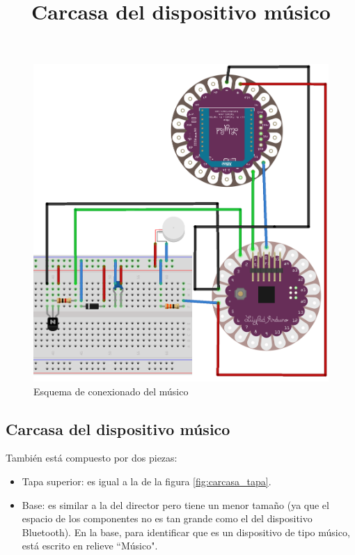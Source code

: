 \begin{figure}[!htb]
\centering
\includegraphics[width=1\textwidth]{./imagenes/musico_esquema}
\caption{Esquema de conexionado del músico} \label{fig:musico_esquema}
\end{figure}


\subsection{Carcasa del dispositivo músico}
\title{Carcasa del dispositivo músico}

También está compuesto por dos piezas:
\begin{itemize}
  \item Tapa superior: es igual a la de la figura \ref{fig:carcasa_tapa}.
  \item Base: es similar a la del director pero tiene un menor tamaño (ya que el espacio
  de los componentes no es tan grande como el del dispositivo Bluetooth). En la base,
  para identificar que es un dispositivo de tipo músico, está escrito en relieve ``Músico".
\end{itemize}


